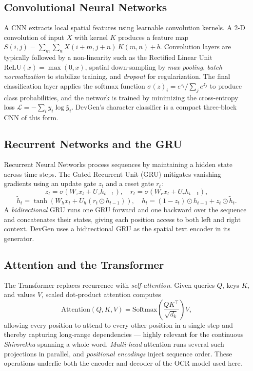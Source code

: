 \documentclass[12pt,a4paper]{report}
\begin{document}
\subsection{Convolutional Neural Networks}
A CNN extracts local spatial features using learnable convolution kernels. A 2-D convolution of input $X$ with kernel $K$ produces a feature map $S(i,j) = \sum_m \sum_n X(i+m, j+n)\,K(m,n) + b$. Convolution layers are typically followed by a non-linearity such as the Rectified Linear Unit $\mathrm{ReLU}(x) = \max(0, x)$, spatial down-sampling by \textit{max pooling}, \textit{batch normalization} to stabilize training, and \textit{dropout} for regularization. The final classification layer applies the softmax function $\sigma(z)_i = e^{z_i} / \sum_j e^{z_j}$ to produce class probabilities, and the network is trained by minimizing the cross-entropy loss $\mathcal{L} = -\sum_i y_i \log \hat{y}_i$. DevGen's character classifier is a compact three-block CNN of this form.

\subsection{Recurrent Networks and the GRU}
Recurrent Neural Networks process sequences by maintaining a hidden state across time steps. The Gated Recurrent Unit (GRU) mitigates vanishing gradients using an update gate $z_t$ and a reset gate $r_t$:
\[
z_t = \sigma(W_z x_t + U_z h_{t-1}), \quad r_t = \sigma(W_r x_t + U_r h_{t-1}),
\]
\[
\tilde{h}_t = \tanh(W_h x_t + U_h (r_t \odot h_{t-1})), \quad h_t = (1-z_t)\odot h_{t-1} + z_t \odot \tilde{h}_t.
\]
A \textit{bidirectional} GRU runs one GRU forward and one backward over the sequence and concatenates their states, giving each position access to both left and right context. DevGen uses a bidirectional GRU as the spatial text encoder in its generator.

\subsection{Attention and the Transformer}
The Transformer replaces recurrence with \textit{self-attention}. Given queries $Q$, keys $K$, and values $V$, scaled dot-product attention computes
\[
\mathrm{Attention}(Q,K,V) = \mathrm{Softmax}\!\left(\frac{QK^\top}{\sqrt{d_k}}\right)V,
\]
allowing every position to attend to every other position in a single step and thereby capturing long-range dependencies --- highly relevant for the continuous \textit{Shirorekha} spanning a whole word. \textit{Multi-head} attention runs several such projections in parallel, and \textit{positional encodings} inject sequence order. These operations underlie both the encoder and decoder of the OCR model used here.
\end{document}
